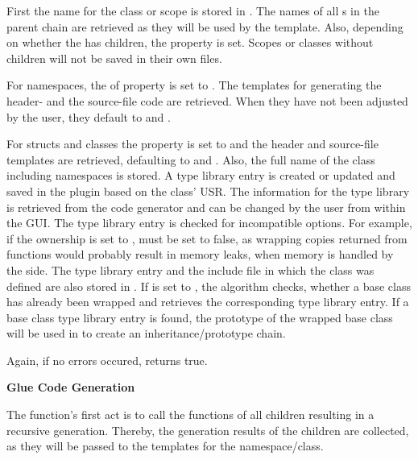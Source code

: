 First the name for the class or scope is stored in . The names of all \linebreak{}s in the parent chain are retrieved as they will be used by the template. Also, depending on whether the  has children, the  property is set. Scopes or classes without children will not be saved in their own files.

For namespaces, the  of property  is set to . The templates for generating the header- and the source-file code are retrieved. When they have not been adjusted by the user, they default to  and .

For structs and classes the  property is set to  and the header and source-file templates are retrieved, defaulting to  and . Also, the full name of the class including namespaces is stored. A type library entry is created or updated and saved in the plugin based on the class' USR. The information for the type library is retrieved from the code generator and can be changed by the user from within the GUI. The type library entry is checked for incompatible options. For example, if the ownership is set to ,  must be set to false, as wrapping copies returned from  functions would probably result in memory leaks, when memory is handled by the  side. The type library entry and the include file in which the class was defined are also stored in . If  is set to , the algorithm checks, whether a base class has already been wrapped and retrieves the corresponding type library entry. If a base class type library entry is found, the prototype  of the wrapped base class will be used in  to create an inheritance/prototype chain.

Again, if no errors occured,  returns true.

\textbf{Glue Code Generation}

The  function's first act is to call the  functions of all children resulting in a recursive generation. Thereby, the generation results of the children are collected, as they will be passed to the templates for the namespace/class.

